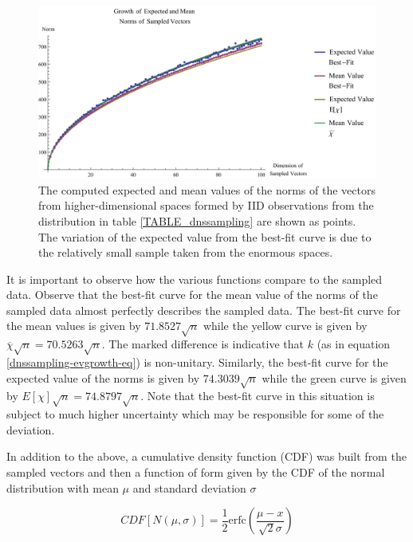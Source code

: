\documentclass[12pt]{report}
\theoremstyle{remark}
\theoremstyle{definition}
\theoremstyle{definition}
\theoremstyle{definition}
\begin{document}
\begin{figure}
\centering
\includegraphics[width=\textwidth]{../figures/dnssampling-ev_growth.pdf}
\caption[Growth of Expected and Mean Norms of Sampled Vectors]{The computed
expected and mean values of the norms of the vectors from higher-dimensional
spaces formed by IID observations from the distribution in table
\ref{TABLE_dnssampling} are shown as points. The variation of the expected value from the best-fit
curve is due to the relatively small sample taken from the enormous spaces.}
\label{dnssampling-evgrowth}
\end{figure}

It is important to observe how the various functions compare to the sampled
data. Observe that the best-fit curve for the mean value of the norms of the
sampled data almost perfectly describes the sampled data. The best-fit curve for
the mean values is given by $71.8527\sqrt{n}$ while the yellow curve is given by
$\overline{\chi}\sqrt{n}=70.5263\sqrt{n}$. The marked difference is indicative that $k$ (as in equation
\ref{dnssampling-evgrowth-eq}) is non-unitary. Similarly, the best-fit curve for
the expected value of the norms is given by $74.3039\sqrt{n}$ while the green
curve is given by $E[\chi]\sqrt{n}=74.8797\sqrt{n}$. Note that the best-fit curve in this
situation is subject to much higher uncertainty which may be responsible for
some of the deviation.

In addition to the above, a cumulative density function (CDF) was built from the
sampled vectors and then a function of form given by the CDF of the normal
distribution with mean $\mu$ and standard deviation $\sigma$

\begin{equation}
CDF[N(\mu,\sigma)]=\frac{1}{2} \text{erfc}\left(\frac{\mu -x}{\sqrt{2} \sigma}\right)
\end{equation}
\end{document}
